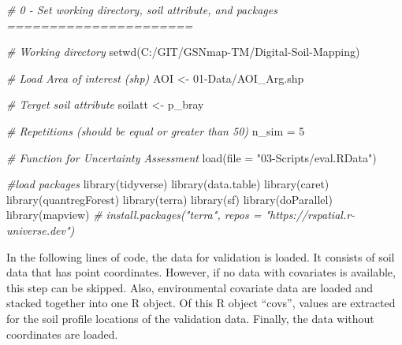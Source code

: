 \documentclass[
  10pt,
  b5paper,
  oneside]{book}
\newenvironment{Shaded}{\begin{snugshade}}{\end{snugshade}}
\newcommand{\AttributeTok}[1]{\textcolor[rgb]{0.77,0.63,0.00}{#1}}
\newcommand{\CommentTok}[1]{\textcolor[rgb]{0.56,0.35,0.01}{\textit{#1}}}
\newcommand{\DecValTok}[1]{\textcolor[rgb]{0.00,0.00,0.81}{#1}}
\newcommand{\FunctionTok}[1]{\textcolor[rgb]{0.00,0.00,0.00}{#1}}
\newcommand{\NormalTok}[1]{#1}
\newcommand{\OtherTok}[1]{\textcolor[rgb]{0.56,0.35,0.01}{#1}}
\newcommand{\StringTok}[1]{\textcolor[rgb]{0.31,0.60,0.02}{#1}}
\begin{document}
\begin{Shaded}
\begin{Highlighting}[]
\CommentTok{\# 0 {-} Set working directory, soil attribute, and packages ======================}

\CommentTok{\# Working directory}
\FunctionTok{setwd}\NormalTok{(}\StringTok{\textquotesingle{}C:/GIT/GSNmap{-}TM/Digital{-}Soil{-}Mapping\textquotesingle{}}\NormalTok{)}

\CommentTok{\# Load Area of interest (shp)}
\NormalTok{AOI }\OtherTok{\textless{}{-}} \StringTok{\textquotesingle{}01{-}Data/AOI\_Arg.shp\textquotesingle{}}

\CommentTok{\# Terget soil attribute}
\NormalTok{soilatt }\OtherTok{\textless{}{-}} \StringTok{\textquotesingle{}p\_bray\textquotesingle{}}

\CommentTok{\# Repetitions (should be equal or greater than 50)}
\NormalTok{n\_sim }\OtherTok{=} \DecValTok{5}

\CommentTok{\# Function for Uncertainty Assessment}
\FunctionTok{load}\NormalTok{(}\AttributeTok{file =} \StringTok{"03{-}Scripts/eval.RData"}\NormalTok{)}

\CommentTok{\#load packages}
\FunctionTok{library}\NormalTok{(tidyverse)}
\FunctionTok{library}\NormalTok{(data.table)}
\FunctionTok{library}\NormalTok{(caret)}
\FunctionTok{library}\NormalTok{(quantregForest)}
\FunctionTok{library}\NormalTok{(terra)}
\FunctionTok{library}\NormalTok{(sf)}
\FunctionTok{library}\NormalTok{(doParallel)}
\FunctionTok{library}\NormalTok{(mapview)}
\CommentTok{\# install.packages("terra", repos = "https://rspatial.r{-}universe.dev")}
\end{Highlighting}
\end{Shaded}

In the following lines of code, the data for validation is loaded. It consists of soil data that has point coordinates. However, if no data with covariates is available, this step can be skipped.
Also, environmental covariate data are loaded and stacked together into one R object. Of this R object ``covs'', values are extracted for the soil profile locations of the validation data.
Finally, the data without coordinates are loaded.
\end{document}
